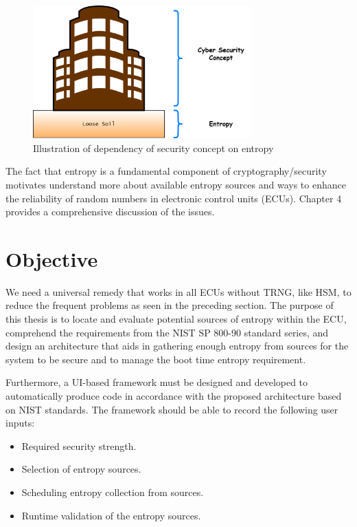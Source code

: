 \begin{figure}[htbp]
	\centering
	\includegraphics[width=0.75\textwidth]{gfx/diagrams/EffectOfWeakEntropy}
	\caption{Illustration of dependency of security concept on entropy}
	\label{fig:1:1}
\end{figure}

The fact that entropy is a fundamental component of cryptography/security motivates understand more about available entropy sources and ways to enhance the reliability of random numbers in electronic control units (ECUs). Chapter 4 provides a comprehensive discussion of the issues.

%
%
\section{Objective}
\label{sec:intro:Objective}

We need a universal remedy that works in all ECUs without TRNG, like HSM, to reduce the frequent problems as seen in the preceding section. The purpose of this thesis is to locate and evaluate potential sources of entropy within the ECU, comprehend the requirements from the NIST SP 800-90 standard series, and design an architecture that aids in gathering enough entropy from sources for the system to be secure and to manage the boot time entropy requirement. 

Furthermore, a UI-based framework must be designed and developed to automatically produce code in accordance with the proposed architecture based on NIST standards. The framework should be able to record the following user inputs:

\begin{itemize}
	\item Required security strength.
	\item Selection of entropy sources.
	\item Scheduling entropy collection from sources.
	\item Runtime validation of the entropy sources.
\end{itemize}

